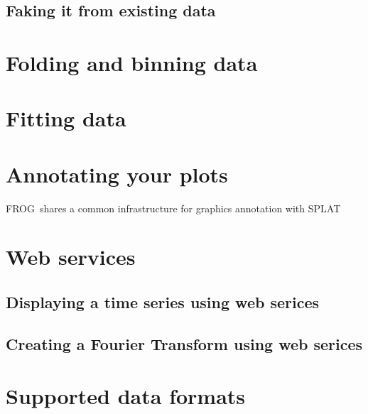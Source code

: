 \documentclass[twoside,11pt]{article}
\newcommand{\xlabel}[1]{}
\renewcommand{\_}{\texttt{\symbol{95}}}
\newcommand{\FROG}{\textsf{FROG}}
\newcommand{\SPLAT}{\textsf{SPLAT}}
\begin{document}
\subsection{Faking it from existing data\xlabel{fake_from_data}}

\section{Folding and binning data\xlabel{folding_and_binning}}

\section{Fitting data\xlabel{fitting_data}}

\section{Annotating your plots\xlabel{annotating your plots}}

\FROG\ shares a common infrastructure for graphics annotation with \SPLAT\

\section{Web services\xlabel{web_services}}

\subsection{Displaying a time series using web serices\xlabel{display_a_time_series_via_ws}}

\subsection{Creating a Fourier Transform using web serices\xlabel{generating_an_fft_via_ws}}

\section{Supported data formats\xlabel{supported_formats}}
\end{document}
